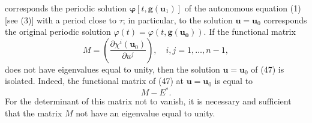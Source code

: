\documentclass[10pt,a5paper]{book}
\theoremstyle{plain}
\theoremstyle{definition}
\theoremstyle{remark}
\begin{document}
corresponds the periodic solution $\boldsymbol{\varphi}\left[t, \mathbf{g}\left(\mathbf{u}_{1}\right)\right]$ of the autonomous equation (1) [see (3)] with a period close to $\tau$; in particular, to the solution $\mathbf{u}=\mathbf{u}_{0}$ corresponds the original periodic solution $\varphi(t)=\varphi\left(t, \mathbf{g}\left(\mathbf{u}_{\mathbf{0}}\right)\right)$. If the functional matrix
\[
M=\left(\frac{\partial \chi^{i}\left(\mathbf{u}_{0}\right)}{\partial u^{j}}\right), \quad i, j=1, \ldots, n-1,
\]
does not have eigenvalues equal to unity, then the solution $\mathbf{u}=\mathbf{u}_{0}$ of (47) is isolated. Indeed, the functional matrix of (47) at $\mathbf{u}=\mathbf{u}_{0}$ is equal to
\[
M-E^{*} .
\]
For the determinant of this matrix not to vanish, it is necessary and sufficient that the matrix $M$ not have an eigenvalue equal to unity.
\end{document}
